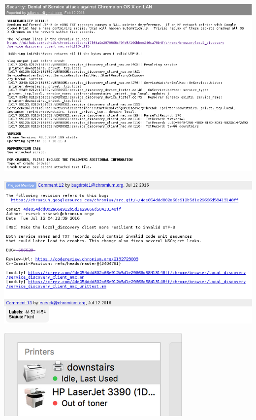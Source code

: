 \documentclass[aspectratio=169]{beamer}
\begin{document}
\begin{frame}
  \begin{center}
    \includegraphics[scale=0.5]{bug-report}
  \end{center}
\end{frame}

\begin{frame}
  \begin{center}
    \includegraphics[scale=0.5]{alls-well-that-ends-well}
  \end{center}
\end{frame}

\begin{frame}
  \begin{center}
    \includegraphics[scale=0.5]{printer-downstairs}
  \end{center}
\end{frame}
\end{document}
